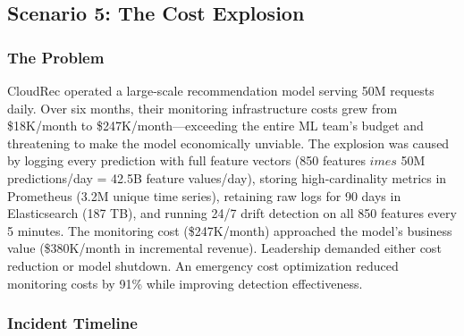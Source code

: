 \subsection{Scenario 5: The Cost Explosion}

\subsubsection{The Problem}

CloudRec operated a large-scale recommendation model serving 50M requests daily. Over six months, their monitoring infrastructure costs grew from \$18K/month to \$247K/month---exceeding the entire ML team's budget and threatening to make the model economically unviable. The explosion was caused by logging every prediction with full feature vectors (850 features $	imes$ 50M predictions/day = 42.5B feature values/day), storing high-cardinality metrics in Prometheus (3.2M unique time series), retaining raw logs for 90 days in Elasticsearch (187 TB), and running 24/7 drift detection on all 850 features every 5 minutes. The monitoring cost (\$247K/month) approached the model's business value (\$380K/month in incremental revenue). Leadership demanded either cost reduction or model shutdown. An emergency cost optimization reduced monitoring costs by 91\% while improving detection effectiveness.

\subsubsection{Incident Timeline}

